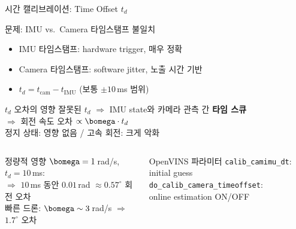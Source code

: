 \begin{frame}[shrink=10]{시간 캘리브레이션: Time Offset $t_d$}
  \begin{block}{문제: IMU vs.\ Camera 타임스탬프 불일치}
    \begin{itemize}
      \item IMU 타임스탬프: hardware trigger, 매우 정확
      \item Camera 타임스탬프: software jitter, 노출 시간 기반
      \item $t_d = t_{\text{cam}} - t_{\text{IMU}}$ (보통 $\pm 10$\,ms 범위)
    \end{itemize}
  \end{block}
  \begin{block}{$t_d$ 오차의 영향}
    잘못된 $t_d$ $\Rightarrow$ IMU state와 카메라 관측 간 \textbf{타임 스큐}\\
    $\Rightarrow$ 회전 속도 오차 $\propto \bomega \cdot t_d$\\
    정지 상태: 영향 없음 / 고속 회전: 크게 악화
  \end{block}
  \begin{columns}[T]
      \begin{alertblock}{정량적 영향}
        $\bomega = 1$\,rad/s, $t_d = 10$\,ms:\\
        $\Rightarrow$ $10$\,ms 동안 $0.01$\,rad $\approx 0.57^\circ$ 회전 오차\\
        빠른 드론: $\bomega \sim 3$\,rad/s $\Rightarrow$ $1.7^\circ$ 오차
      \end{alertblock}
      \begin{exampleblock}{OpenVINS 파라미터}
        \texttt{calib\_camimu\_dt}: initial guess\\
        \texttt{do\_calib\_camera\_timeoffset}: \\
        online estimation ON/OFF
      \end{exampleblock}
  \end{columns}
\end{frame}


